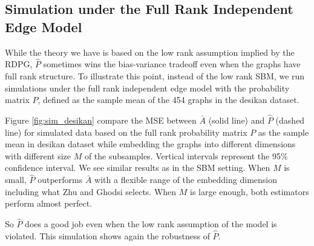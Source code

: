 \documentclass[a4paper]{article}
\begin{document}
%
%


\subsection{Simulation under the Full Rank Independent Edge Model}

While the theory we have is based on the low rank assumption implied by the RDPG, $\hat{P}$ sometimes wins the bias-variance tradeoff even when the graphs have full rank structure. To illustrate this point, instead of the low rank SBM, we run simulations under the full rank independent edge model with the probability matrix $P$, defined as the sample mean of the 454 graphs in the desikan dataset.

Figure \ref{fig:sim_desikan} compare the MSE between $\bar{A}$ (solid line) and $\hat{P}$ (dashed line) for simulated data based on the full rank probability matrix $P$ as the sample mean in desikan dataset while embedding the graphs into different dimensions with different size $M$ of the subsamples. Vertical intervals represent the 95\% confidence interval. We see similar results as in the SBM setting. When $M$ is small, $\hat{P}$ outperforms $\bar{A}$ with a flexible range of the embedding dimension including what Zhu and Ghodsi selects. When $M$ is large enough, both estimators perform almost perfect.

So $\hat{P}$ does a good job even when the low rank assumption of the model is violated. This simulation shows again the robustness of $\hat{P}$.
\end{document}
